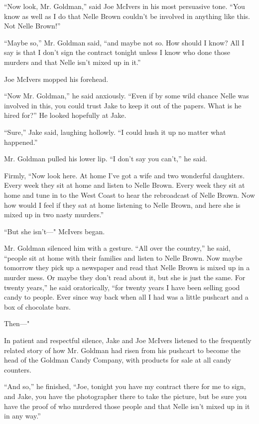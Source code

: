 \documentclass{novel}
\begin{document}
“Now look, Mr. Goldman,” said Joe McIvers in his most persuasive tone. “You know as well as I do that Nelle Brown couldn’t be involved in anything like this. Not Nelle Brown!”

“Maybe so,” Mr. Goldman said, “and maybe not so. How should I know? All I say is that I don’t sign the contract tonight unless I know who done those murders and that Nelle isn’t mixed up in it.”

Joe McIvers mopped his forehead.

“Now Mr. Goldman,” he said anxiously. “Even if by some wild chance Nelle was involved in this, you could trust Jake to keep it out of the papers. What is he hired for?” He looked hopefully at Jake.

“Sure,” Jake said, laughing hollowly. “I could hush it up no matter what happened.”

Mr. Goldman pulled his lower lip. “I don’t say you can’t,” he said.

Firmly, “Now look here. At home I've got a wife and two wonderful daughters. Every week they sit at home and listen to Nelle Brown. Every week they sit at home and tune in to the West Coast to hear the rebroadcast of Nelle Brown. Now how would I feel if they sat at home listening to Nelle Brown, and here she is mixed up in two nasty murders.”

“But she isn’t—" McIvers began.

Mr. Goldman silenced him with a gesture. “All over the country,” he said, “people sit at home with their families and listen to Nelle Brown. Now maybe tomorrow they pick up a newspaper and read that Nelle Brown is mixed up in a murder mess. Or maybe they don’t read about it, but she is just the same. For twenty years,” he said oratorically, “for twenty years I have been selling good candy to people. Ever since way back when all I had was a little pushcart and a box of chocolate bars.

Then—"

In patient and respectful silence, Jake and Joe McIvers listened to the frequently related story of how Mr. Goldman had risen from his pushcart to become the head of the Goldman Candy Company, with products for sale at all candy counters.

“And so,” he finished, “Joe, tonight you have my contract there for me to sign, and Jake, you have the photographer there to take the picture, but be sure you have the proof of who murdered those people and that Nelle isn’t mixed up in it in any way.”
\end{document}
